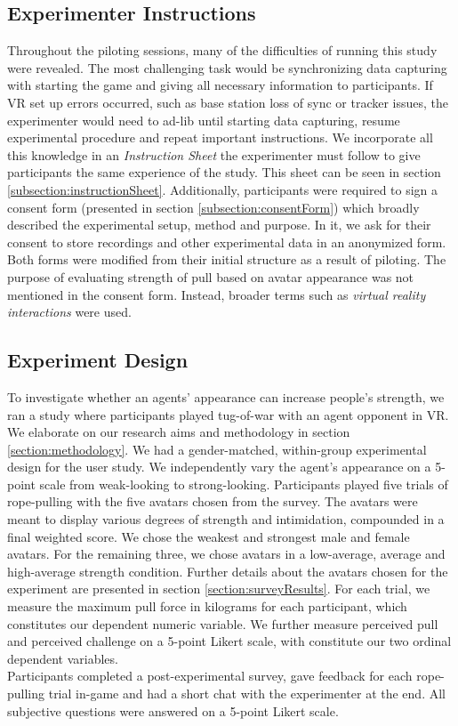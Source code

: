 \subsection{Experimenter Instructions}
Throughout the piloting sessions, many of the difficulties of running this study were revealed. The most challenging task would be synchronizing data capturing with starting the game and giving all necessary information to participants. If VR set up errors occurred, such as base station loss of sync or tracker issues, the experimenter would need to ad-lib until starting data capturing, resume experimental procedure and repeat important instructions. We incorporate all this knowledge in an \textit{Instruction Sheet} the experimenter must follow to give participants the same experience of the study. This sheet can be seen in section \ref{subsection:instructionSheet}. Additionally, participants were required to sign a consent form (presented in section \ref{subsection:consentForm}) which broadly described the experimental setup, method and purpose. In it, we ask for their consent to store recordings and other experimental data in an anonymized form. Both forms were modified from their initial structure as a result of piloting. The purpose of evaluating strength of pull based on avatar appearance was not mentioned in the consent form. Instead, broader terms such as \textit{virtual reality interactions} were used.

\subsection{Experiment Design}
\label{subsection:ExperimentDesign}
To investigate whether an agents' appearance can increase people's strength, we ran a study where participants played tug-of-war with an agent opponent in VR. We elaborate on our research aims and methodology in section \ref{section:methodology}. We had a gender-matched, within-group experimental design for the user study. We independently vary the agent's appearance on a 5-point scale from weak-looking to strong-looking. Participants played five trials of rope-pulling with the five avatars chosen from the survey. The avatars were meant to display various degrees of strength and intimidation, compounded in a final weighted score. We chose the weakest and strongest male and female avatars. For the remaining three, we chose avatars in a low-average, average and high-average strength condition. Further details about the avatars chosen for the experiment are presented in section \ref{section:surveyResults}. For each trial, we measure the maximum pull force in kilograms for each participant, which constitutes our dependent numeric variable. We further measure perceived pull and perceived challenge on a 5-point Likert scale, with constitute our two ordinal dependent variables.\\
Participants completed a post-experimental survey, gave feedback for each rope-pulling trial in-game and had a short chat with the experimenter at the end. All subjective questions were answered on a 5-point Likert scale.\\

